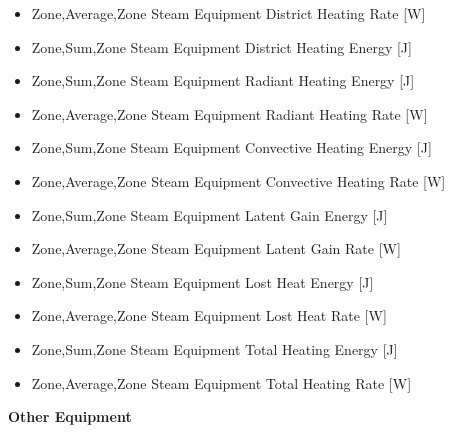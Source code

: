 \begin{itemize}
\item
  Zone,Average,Zone Steam Equipment District Heating Rate {[}W{]}
\item
  Zone,Sum,Zone Steam Equipment District Heating Energy {[}J{]}
\item
  Zone,Sum,Zone Steam Equipment Radiant Heating Energy {[}J{]}
\item
  Zone,Average,Zone Steam Equipment Radiant Heating Rate {[}W{]}
\item
  Zone,Sum,Zone Steam Equipment Convective Heating Energy {[}J{]}
\item
  Zone,Average,Zone Steam Equipment Convective Heating Rate {[}W{]}
\item
  Zone,Sum,Zone Steam Equipment Latent Gain Energy {[}J{]}
\item
  Zone,Average,Zone Steam Equipment Latent Gain Rate {[}W{]}
\item
  Zone,Sum,Zone Steam Equipment Lost Heat Energy {[}J{]}
\item
  Zone,Average,Zone Steam Equipment Lost Heat Rate {[}W{]}
\item
  Zone,Sum,Zone Steam Equipment Total Heating Energy {[}J{]}
\item
  Zone,Average,Zone Steam Equipment Total Heating Rate {[}W{]}
\end{itemize}

\textbf{Other Equipment}

